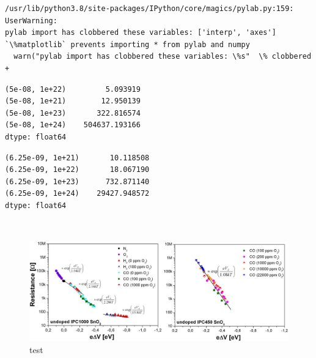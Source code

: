\documentclass[11pt]{article}
\makeatletter
\newcommand{\boxspacing}{\kern\kvtcb@left@rule\kern\kvtcb@boxsep}
\newcommand{\prompt}[4]{
        \ttfamily\llap{{\color{#2}[#3]:\hspace{3pt}#4}}\vspace{-\baselineskip}
    }
\makeatother
\begin{document}
    \begin{Verbatim}[commandchars=\\\{\}]
/usr/lib/python3.8/site-packages/IPython/core/magics/pylab.py:159: UserWarning:
pylab import has clobbered these variables: ['interp', 'axes']
`\%matplotlib` prevents importing * from pylab and numpy
  warn("pylab import has clobbered these variables: \%s"  \% clobbered +
    \end{Verbatim}

    
    \begin{verbatim}
(5e-08, 1e+22)         5.093919
(5e-08, 1e+21)        12.950139
(5e-08, 1e+23)       322.816574
(5e-08, 1e+24)    504637.193166
dtype: float64
    \end{verbatim}

    
    
    \begin{verbatim}
(6.25e-09, 1e+21)       10.118508
(6.25e-09, 1e+22)       18.067190
(6.25e-09, 1e+23)      732.871140
(6.25e-09, 1e+24)    29427.948572
dtype: float64
    \end{verbatim}

    
    \begin{center}
    \end{center}
    { \hspace*{\fill} \\}
    
    \begin{figure}
\centering
\includegraphics{media/WF450und1000.jpg}
\caption{test}
\end{figure}

    \begin{tcolorbox}[breakable, size=fbox, boxrule=1pt, pad at break*=1mm,colback=cellbackground, colframe=cellborder]
\prompt{In}{incolor}{9}{\boxspacing}
\begin{Verbatim}[commandchars=\\\{\}]

\end{Verbatim}
\end{tcolorbox}


    
    
    
\end{document}
